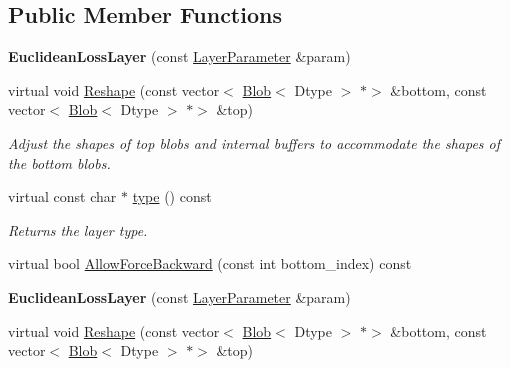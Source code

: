\subsection*{Public Member Functions}
\begin{DoxyCompactItemize}
\item 
\mbox{\label{classcaffe_1_1_euclidean_loss_layer_aea3a6d5454ee1a0db7cdb6c59bcfc5c8}} 
{\bfseries Euclidean\+Loss\+Layer} (const \mbox{\hyperlink{classcaffe_1_1_layer_parameter}{Layer\+Parameter}} \&param)
\item 
virtual void \mbox{\hyperlink{classcaffe_1_1_euclidean_loss_layer_a9cbe90ea0130c31bd5b9419a1bbaa555}{Reshape}} (const vector$<$ \mbox{\hyperlink{classcaffe_1_1_blob}{Blob}}$<$ Dtype $>$ $\ast$$>$ \&bottom, const vector$<$ \mbox{\hyperlink{classcaffe_1_1_blob}{Blob}}$<$ Dtype $>$ $\ast$$>$ \&top)
\begin{DoxyCompactList}\small\item\em Adjust the shapes of top blobs and internal buffers to accommodate the shapes of the bottom blobs. \end{DoxyCompactList}\item 
\mbox{\label{classcaffe_1_1_euclidean_loss_layer_afe52ebbfc18c5cc36e0bdc35445c82e5}} 
virtual const char $\ast$ \mbox{\hyperlink{classcaffe_1_1_euclidean_loss_layer_afe52ebbfc18c5cc36e0bdc35445c82e5}{type}} () const
\begin{DoxyCompactList}\small\item\em Returns the layer type. \end{DoxyCompactList}\item 
virtual bool \mbox{\hyperlink{classcaffe_1_1_euclidean_loss_layer_a76dd3fde9f09cb9840f05ee035b5a2c5}{Allow\+Force\+Backward}} (const int bottom\+\_\+index) const
\item 
\mbox{\label{classcaffe_1_1_euclidean_loss_layer_aea3a6d5454ee1a0db7cdb6c59bcfc5c8}} 
{\bfseries Euclidean\+Loss\+Layer} (const \mbox{\hyperlink{classcaffe_1_1_layer_parameter}{Layer\+Parameter}} \&param)
\item 
virtual void \mbox{\hyperlink{classcaffe_1_1_euclidean_loss_layer_ab7f1b879898ffba67cf5035f6a56d8eb}{Reshape}} (const vector$<$ \mbox{\hyperlink{classcaffe_1_1_blob}{Blob}}$<$ Dtype $>$ $\ast$$>$ \&bottom, const vector$<$ \mbox{\hyperlink{classcaffe_1_1_blob}{Blob}}$<$ Dtype $>$ $\ast$$>$ \&top)

\end{DoxyCompactItemize}
